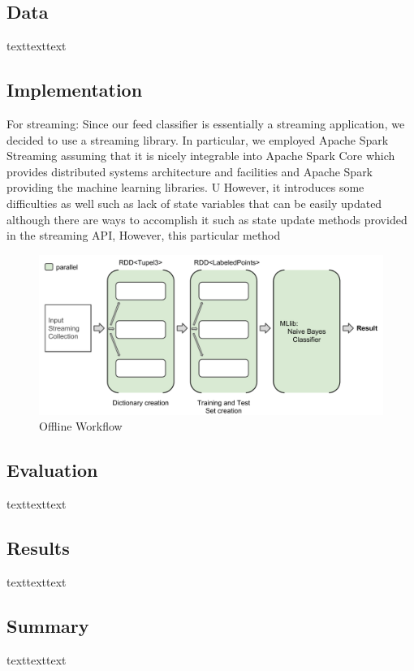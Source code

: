 \documentclass[12pt]{article}
\begin{document}
\subsection{Data}
texttexttext

\newpage
\subsection{Implementation}

For streaming:
Since our feed classifier is essentially a streaming application, we decided to use a streaming library. In particular, we employed Apache Spark Streaming assuming that it is nicely integrable into Apache Spark Core which provides distributed systems architecture and facilities and Apache Spark providing the machine learning libraries. U
However, it introduces some difficulties as well such as lack of state variables that can be easily updated although there are ways to accomplish it such as state update methods provided in the streaming API, However, this particular method

\begin{figure}[htbp]
  \centering
  \includegraphics[scale=0.56]{VisualisationOfflineWorkflow.pdf}
  \caption{Offline Workflow}
\end{figure}

\subsection{Evaluation}
texttexttext

\subsection{Results}
texttexttext

\subsection{Summary}
texttexttext

\newpage
\medskip

\end{document}
